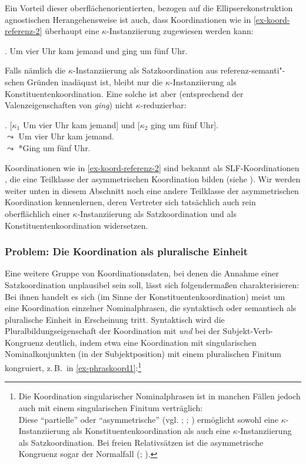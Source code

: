 Ein Vorteil dieser oberflächenorientierten, bezogen auf die Ellipserekonstruktion agnostischen Herangehensweise ist auch, dass Koordinationen wie in \ref{ex-koord-referenz-2} überhaupt eine $\kappa$-Instan\-ziierung zugewiesen werden kann:

\ex. \label{ex-koord-referenz-2}Um vier Uhr kam jemand und ging um fünf Uhr.

Falls nämlich die $\kappa$-Instanziierung als Satzkoordination aus referenz-semanti"-schen Gründen inadäquat ist, bleibt nur die $\kappa$-Instanziierung als Konstituentenkoordination. Eine solche ist aber (entsprechend der Valenzeigenschaften von {\it ging}) nicht $\kappa$-reduzierbar:

\ex. [$\kappa_1$ Um vier Uhr kam jemand] und [$\kappa_2$ ging um fünf Uhr]. \\
$\leadsto$ Um vier Uhr kam jemand. \\
$\leadsto$ *Ging um fünf Uhr.

Koordinationen wie in \ref{ex-koord-referenz-2} sind bekannt als SLF-Koordinationen \citep{Hoehle:83}, die eine Teilklasse der asymmetrischen Koordination bilden (siehe \citealt[1f]{Reich:09}). Wir werden weiter unten in diesem Abschnitt noch eine andere Teilklasse der asymmetrischen Koordination kennenlernen, deren Vertreter sich tatsächlich auch rein oberflächlich einer $\kappa$-Instanziierung als Satzkoordination und als Konstituentenkoordination widersetzen.   


\subsubsection*{Problem: Die Koordination als pluralische Einheit} \label{sec-plural}

Eine weitere Gruppe von Koordinationsdaten, bei denen die Annahme einer Satzkoordination unplausibel sein soll, lässt sich folgenderma\ss en charakterisieren: Bei ihnen handelt es sich (im Sinne der Konstituentenkoordination) meist um eine Koordination einzelner Nominalphrasen, die syntaktisch oder semantisch als pluralische Einheit in Erscheinung tritt. Syntaktisch wird die Pluralbildungseigenschaft der Koordination mit {\it und} bei der Subjekt-Verb-Kongruenz deutlich, indem etwa eine Koordination mit singularischen Nominalkonjunkten (in der Subjektposition) mit einem pluralischen Finitum kongruiert, z.\,B.\ in \ref{ex-phraskoord1}:\footnote{Die Koordination singularischer Nominalphrasen ist in manchen Fällen jedoch auch mit einem singularischen Finitum verträglich:\\
Diese "`partielle"' oder "`asymmetrische"'  (vgl. \citealt{Munn:00}; \citealt{Lorimor:07}; \citealt{Steiner:09}) ermöglicht sowohl eine $\kappa$-Instanziierung als Konstituentenkoordination als auch eine $\kappa$-Instanziierung als Satzkoordination. Bei freien Relativsätzen ist die asymmetrische Kongruenz sogar der Normalfall (\citealt[143]{Oppenrieder:91}; \citealt[Abschnitt~10.4.1.1]{Mueller:99}).}

